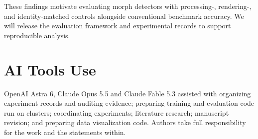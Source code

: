 \documentclass[10pt,twocolumn,letterpaper]{article}
\begin{document}
These findings motivate evaluating morph detectors
with processing-, rendering-, and identity-matched
controls alongside conventional benchmark accuracy.
We will release the evaluation framework and
experimental records to support reproducible analysis.


\section*{AI Tools Use}
OpenAI Astra 6, Claude Opus 5.5 and Claude Fable 5.3 assisted with organizing experiment records and auditing evidence; preparing training and evaluation code run on clusters; coordinating experiments; literature research; manuscript revision; and preparing data visualization code. Authors take full responsibility for the work and the statements within.





{\small}
\end{document}
